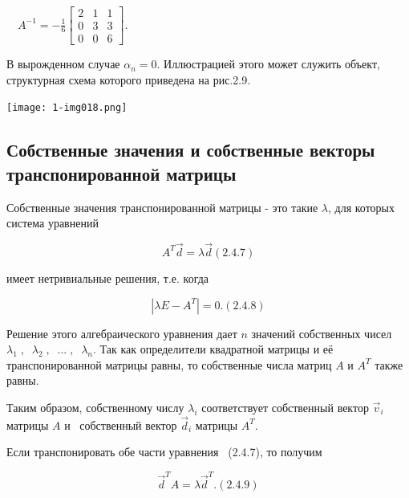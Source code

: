 		\ \  $A^{-1}=-\frac 1 6\left[\begin{matrix}2&1&1\\0&3&3\\0&0&6\end{matrix}\right]$.



		В вырожденном случае  $α_n=0$. Иллюстрацией этого может служить объект, структурная схема которого приведена на рис.2.9.


{\centering  \texttt{[image: 1-img018.png]} \par}

\bigskip

\subsection{Собственные значения и собственные векторы   транспонированной матрицы}
		Собственные значения транспонированной матрицы - это такие  $\lambda $, для которых система уравнений



	\begin{equation}\label{key}
		 A^T\vec d=\lambda \vec d  (2.4.7)
	\end{equation}



		имеет нетривиальные решения, т.е. когда



\begin{equation}\label{key}
		  |\mathit{\lambda E}-A^T|=0.  (2.4.8)
\end{equation}



		Решение этого алгебраического уравнения дает  $n$ значений собственных чисел  $\lambda _1\;,\;\;\lambda _2\;,\;\;...\;,\;\;\lambda _n$. Так
		как определители квадратной матрицы и её транспонированной матрицы равны, то собственные числа матриц  $A$ и  $A^T$
		также равны. 



		Таким образом, собственному числу  $\lambda _i$ соответствует собственный вектор  $\vec v_i$ матрицы  $A$ и \ собственный
		вектор  $\vec d_i$ матрицы  $A^T$.



		Если транспонировать обе части уравнения \ (2.4.7), то получим



		   \begin{equation}\label{key}
		    \vec d^TA=\lambda \vec d^T.  
		    (2.4.9)
		   \end{equation}



